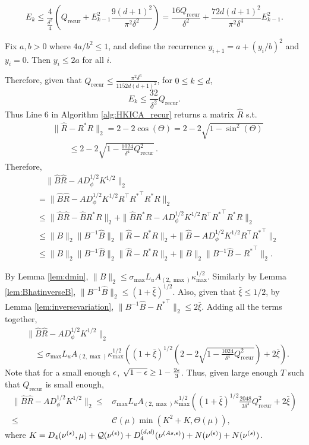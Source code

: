 \[
E_k \le \frac{4}{\frac{\delta^2}{4}}\left(Q_{\text{recur}}+ E_{k-1}^2 \frac{9(d+1)^2}{\pi^2\delta^2}\right) = \frac{16Q_{\text{recur}}}{\delta^2} + \frac{72d(d+1)^2 }{\pi^2\delta^4}E_{k-1}^2.
\]

\begin{prop}
	Fix $a,b>0$ where $4a/b^2 \le 1$, and define the recurrence $y_{i+1} = a + (y_i/b)^2$ and $y_i = 0$. Then $y_i \le 2a $ for all $i$.
\end{prop}
Therefore, given that $Q_{\text{recur}} \le \frac{\pi^2\delta^6}{1152d(d+1)^2}$, for $0\le k\le d$,
\[
E_k \le \frac{32}{\delta^2} Q_{\text{recur}}. 
\]
Thus Line 6 in Algorithm \ref{alg:HKICA_recur} returns a matrix $\hat{R}$ s.t.
\begin{align*}
& \|\hat{R} - R^*R\|_2 = 2-2\cos(\Theta)= 2 - 2\sqrt{1-\sin^2(\Theta)} \\
& \qquad \le 2 - 2\sqrt{1- \frac{1024}{\delta^4} Q_{\text{recur}}^2}\,.
\end{align*}
Therefore,
\begin{align*}
& \quad \| \hat{B}\hat{R} - AD_{\phi}^{1/2}K^{1/2}\|_2 \\
& = \| \hat{B}\hat{R} - AD_{\phi}^{1/2}K^{1/2}R^{\top}{R^*}^{\top}R^*R\|_2 \\
& \le \| \hat{B}\hat{R} -  \hat{B}R^*R\|_2 + \|\hat{B}R^*R - AD_{\phi}^{1/2}K^{1/2}R^{\top}{R^*}^{\top}R^*R \|_2 \\
& \le \|B\|_2\|B^{-1}\hat{B}\|_2\|\hat{R} - R^*R\|_2 + \|\hat{B} - AD_{\phi}^{1/2}K^{1/2}R^{\top}{R^*}^{\top}\|_2 \\
& \le  \|B\|_2\|B^{-1}\hat{B}\|_2\|\hat{R} - R^*R\|_2 +\|B\|_2\|B^{-1}\hat{B} - {R^*}^{\top}\|_2.
\end{align*}

By Lemma \ref{lem:dmin}, 
$ \|B\|_2 \le \sigma_{\max}L_uA_{(2,\max)}\kappa_{\max}^{1/2}$. 
Similarly by Lemma \ref{lem:BhatinverseB}, $\| B^{-1}\hat{B}\|_2 \le (1+\bar{\xi})^{1/2}$. 
Also, given that $\bar{\xi} \le 1/2$, by Lemma \ref{lem:inversevariation}, $\|B^{-1}\hat{B} -{R^*}^{\top}\|_2 \le 2\bar{\xi}$.
Adding all the terms together,
\begin{align*}
& \| \hat{B}\hat{R} - AD_{\phi}^{1/2}K^{1/2}\|_2\\
& \quad \le \sigma_{\max}L_uA_{(2,\max)}\kappa_{\max}^{1/2}\left((1+\bar{\xi})^{1/2}\left(  2 - 2\sqrt{1- \frac{1024}{\delta^4} Q_{\text{recur}}^2}\right) + 2\bar{\xi}\right).
\end{align*}
Note that for a small enough $\epsilon$, $\sqrt{1-\epsilon} \ge 1-\frac{2\epsilon}{3}$. Thus, given large enough $T$ such that $Q_{\text{recur}}$ is small enough,
\begin{align*}
\| \hat{B}\hat{R} - AD_{\phi}^{1/2}K^{1/2}\|_2 \le & \sigma_{\max}L_uA_{(2,\max)}\kappa_{\max}^{1/2}\left((1+\bar{\xi})^{1/2}\frac{2048}{3\delta^4} Q_{\text{recur}}^2+ 2\bar{\xi}\right) \\
\le & \mathcal{C}(\mu) \min\left(K^2+K, \Theta(\mu) \right),
\end{align*}
where $K = D_4(\nu^{(s)},\mu)+ \mathcal{Q}(\nu^{(\epsilon)}) + D_4^{(d,d)}(\nu^{(As,\epsilon)})
+N(\nu^{(\epsilon)}) + N( \nu^{(s)})$.

